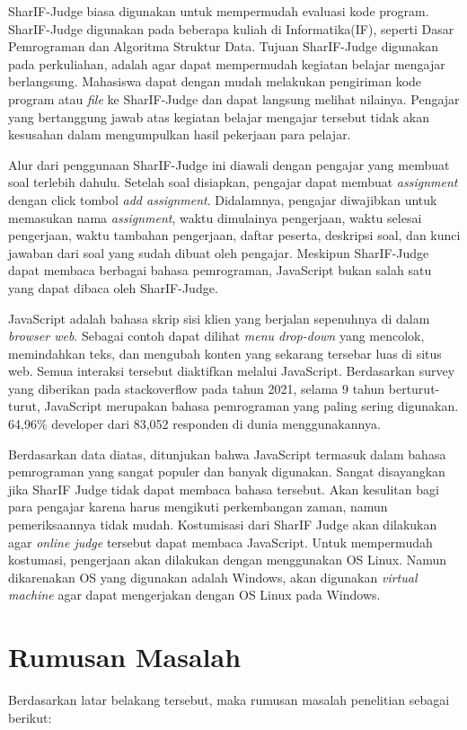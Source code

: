 \documentclass[a4paper,twoside]{article}
\begin{document}
SharIF-Judge biasa digunakan untuk mempermudah evaluasi kode program.  SharIF-Judge digunakan pada beberapa kuliah di Informatika(IF), seperti Dasar Pemrograman dan Algoritma Struktur Data. Tujuan SharIF-Judge digunakan pada perkuliahan, adalah agar dapat mempermudah kegiatan belajar mengajar berlangsung. Mahasiswa dapat dengan mudah melakukan pengiriman kode program atau \textit{file} ke SharIF-Judge dan dapat langsung melihat nilainya. Pengajar yang bertanggung jawab atas kegiatan belajar mengajar tersebut tidak akan kesusahan dalam mengumpulkan hasil pekerjaan para pelajar. 

Alur dari penggunaan SharIF-Judge ini diawali dengan pengajar yang membuat soal terlebih dahulu. Setelah soal disiapkan, pengajar dapat membuat \textit{assignment} dengan click tombol \textit{add assignment}. Didalamnya, pengajar diwajibkan untuk memasukan nama \textit{assignment}, waktu dimulainya pengerjaan, waktu selesai pengerjaan, waktu tambahan pengerjaan, daftar peserta, deskripsi soal, dan kunci jawaban dari soal yang sudah dibuat oleh pengajar. Meskipun SharIF-Judge dapat membaca berbagai bahasa pemrograman, JavaScript bukan salah satu yang dapat dibaca oleh SharIF-Judge.

JavaScript adalah bahasa skrip sisi klien yang berjalan sepenuhnya di dalam \textit{browser web}. Sebagai contoh dapat dilihat \textit{menu drop-down} yang mencolok, memindahkan teks, dan mengubah konten yang sekarang tersebar luas di situs web. Semua interaksi tersebut diaktifkan melalui JavaScript. Berdasarkan survey yang diberikan pada stackoverflow pada tahun 2021, selama 9 tahun berturut-turut, JavaScript merupakan bahasa pemrograman yang paling sering digunakan. 64,96\% developer dari 83,052 responden di dunia menggunakannya.

Berdasarkan data diatas, ditunjukan bahwa JavaScript termasuk dalam bahasa pemrograman yang sangat populer dan banyak digunakan. Sangat disayangkan jika SharIF Judge tidak dapat membaca bahasa tersebut. Akan kesulitan bagi para pengajar karena harus mengikuti perkembangan zaman, namun pemeriksaannya tidak mudah. Kostumisasi dari SharIF Judge akan dilakukan agar \textit{online judge} tersebut dapat membaca JavaScript. Untuk mempermudah kostumasi, pengerjaan akan dilakukan dengan menggunakan OS Linux. Namun dikarenakan OS yang digunakan adalah Windows, akan digunakan \textit{virtual machine} agar dapat mengerjakan dengan OS Linux pada Windows. 

\section{Rumusan Masalah}
Berdasarkan latar belakang tersebut, maka rumusan masalah penelitian sebagai berikut: 
\end{document}

